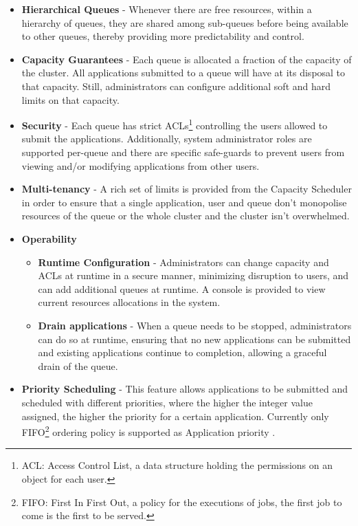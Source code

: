 \begin{itemize}

\item \textbf{Hierarchical Queues} - Whenever there are free resources, within a hierarchy of queues, they are shared among sub-queues before being available to other queues, thereby providing more predictability and control. 

\item \textbf{Capacity Guarantees} - Each queue is allocated a fraction of the capacity of the cluster. All applications submitted to a queue will have at its disposal to that capacity. Still, administrators can configure additional soft and hard limits on that capacity. 

\item \textbf{Security} - Each queue has strict ACLs\footnote{ACL: Access Control List, a data structure holding the permissions on an object for each user.} controlling the users allowed to submit the applications. Additionally, system administrator roles are supported per-queue and there are specific safe-guards to prevent users from viewing and/or modifying applications from other users.

\item \textbf{Multi-tenancy} - 
A rich set of limits is provided from the Capacity Scheduler in order to ensure that a single application, user and queue don't monopolise resources of the queue or the whole cluster and the cluster isn't overwhelmed.

\item \textbf{Operability}
    \begin{itemize}
    \item \textbf{Runtime Configuration} - Administrators can change capacity and ACLs at runtime in a secure manner, minimizing disruption to users, and can add additional queues at runtime. A console is provided to view current resources allocations in the system.
    
    \item \textbf{Drain applications} - When a queue needs to be stopped, administrators can do so at runtime, ensuring that no new applications can be submitted and existing applications continue to completion, allowing a graceful drain of the queue.
    \end{itemize}

\item \textbf{Priority Scheduling} - This feature allows applications to be submitted and scheduled with different priorities, where the higher the integer value assigned, the higher the priority for a certain application. Currently only FIFO\footnote{FIFO: First In First Out, a policy for the executions of jobs, the first job to come is the first to be served.} ordering policy is supported as Application priority \cite{yarn_CapSched}.

\end{itemize}

